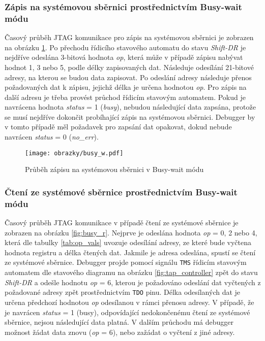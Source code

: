 \subsubsection{Zápis na systémovou sběrnici prostřednictvím Busy-wait módu} 
Časový průběh JTAG komunikace pro zápis na systémovou sběrnici je zobrazen na obrázku \ref{fig:busy_w}. Po přechodu řídicího stavového automatu do stavu \textit{Shift-DR} je nejdříve odeslána 3-bitová hodnota \textit{op}, která může v případě zápisu nabývat hodnot 1, 3 nebo 5, podle délky zapisovaných dat. Následuje odesílání 21-bitové adresy, na kterou se budou data zapisovat. Po odeslání adresy následuje přenos požadovaných dat k zápisu, jejichž délka je určena hodnotou \textit{op}. Pro zápis na další adresu je třeba provést průchod řídicím stavovým automatem. Pokud je navrácena hodnota \textit{status} = 1 (\textit{busy}), nebudou následující data zapsána, protože se musí nejdříve dokončit probíhající zápis na systémovou sběrnici. Debugger by v tomto případě měl požadavek pro zapsání dat opakovat, dokud nebude navrácen \textit{status} = 0 (\textit{no\_err}).

\begin{figure}[H]
  \begin{center}
    \texttt{[image: obrazky/busy\_w.pdf]}
  \end{center}
  \caption{Průběh zápisu na systémovou sběrnici v Busy-wait módu}
	\label{fig:busy_w}
\end{figure}

\subsubsection{Čtení ze systémové sběrnice prostřednictvím Busy-wait módu} 
Časový průběh JTAG komunikace v případě čtení ze systémové sběrnice je zobrazen na obrázku \ref{fig:busy_r}. Nejprve je odeslána hodnota \textit{op} = 0, 2 nebo 4, která dle tabulky \ref{tab:op_vals} uvozuje odesílání adresy, ze které bude vyčtena hodnota registru a délka čtených dat. Jakmile je adresa odeslána, spustí se čtení ze systémové sběrnice. Debugger projde pomocí signálu \texttt{\acs{TMS}} řídicím stavovým automatem dle stavového diagramu na obrázku \ref{fig:tap_controller} zpět do stavu \textit{Shift-DR} a odešle hodnotu \textit{op} = 6, kterou je požadováno odeslání dat vyčtených z požadované adresy zpět prostřednictvím \texttt{\acs{TDO}} pinu. Délka odesílaných dat je určena předchozí hodnotou \textit{op} odesílanou v rámci přenosu adresy. V případě, že je navrácen \textit{status} = 1 (busy), odpovídající nedokončenému čtení ze systémové sběrnice, nejsou následující data platná. V dalším průchodu má debugger možnost žádat data znovu (\textit{op} = 6), nebo zažádat o vyčtení z jiné adresy.

